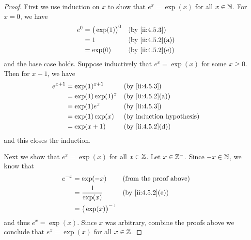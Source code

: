 \begin{proof}
  First we use induction on \(x\) to show that \(e^x = \exp(x)\) for all \(x \in \mathbb{N}\).
  For \(x = 0\), we have
  \begin{align*}
    e^0 & = \big(\exp(1)\big)^0 &  & \by{ii:4.5.3}    \\
        & = 1                   &  & \by{ii:4.5.2}[a] \\
        & = \exp(0)             &  & \by{ii:4.5.2}[e]
  \end{align*}
  and the base case holds.
  Suppose inductively that \(e^x = \exp(x)\) for some \(x \geq 0\).
  Then for \(x + 1\), we have
  \begin{align*}
    e^{x + 1} & = \exp(1)^{x + 1}   &  & \by{ii:4.5.3}    \\
              & = \exp(1) \exp(1)^x &  & \by{ii:4.5.2}[a] \\
              & = \exp(1) e^x       &  & \by{ii:4.5.3}    \\
              & = \exp(1) \exp(x)   &  & \byIH            \\
              & = \exp(x + 1)       &  & \by{ii:4.5.2}[d]
  \end{align*}
  and this closes the induction.

  Next we show that \(e^x = \exp(x)\) for all \(x \in \mathbb{Z}\).
  Let \(x \in \mathbb{Z}^-\).
  Since \(-x \in \mathbb{N}\), we know that
  \begin{align*}
    e^{-x} & = \exp(-x)               &  & \text{(from the proof above)} \\
           & = \dfrac{1}{\exp(x)}     &  & \by{ii:4.5.2}[e]              \\
           & = \big(\exp(x)\big)^{-1}
  \end{align*}
  and thus \(e^x = \exp(x)\).
  Since \(x\) was arbitrary, combine the proofs above we conclude that \(e^x = \exp(x)\) for all \(x \in \mathbb{Z}\).


\end{proof}
